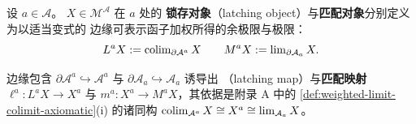 \begin{definition}[锁存对象与匹配对象]\label{def:latching-matching-objects}
设 $a\in\mathcal{A}$。\trDiagram{} $X\in\mathcal{M}^{\mathcal{A}}$ 在 $a$ 处的
\textbf{锁存对象}（latching object）与\textbf{匹配对象}分别定义为以适当变式的
边缘可表示函子加权所得的余极限与极限：
\[ L^{a}X:=\operatorname{colim}_{\partial\mathcal{A}^{a}}X\qquad
   M^{a}X:=\operatorname{lim}_{\partial\mathcal{A}_a}X. \]
\end{definition}

边缘包含 $\partial\mathcal{A}^{a}\hookrightarrow\mathcal{A}^{a}$ 与
$\partial\mathcal{A}_a\hookrightarrow\mathcal{A}_a$ 诱导出\textbf{\trLatchingMap}
（latching map）与\textbf{匹配映射} $\ell^{a}\colon L^{a}X\to X^{a}$ 与
$m^{a}\colon X^{a}\to M^{a}X$，其依据是附录 A 中的%
\cref{def:weighted-limit-colimit-axiomatic}(i) 的诸同构
$\operatorname{colim}_{\mathcal{A}^{a}}X\cong X^{a}\cong\operatorname{lim}_{\mathcal{A}_a}X$。

